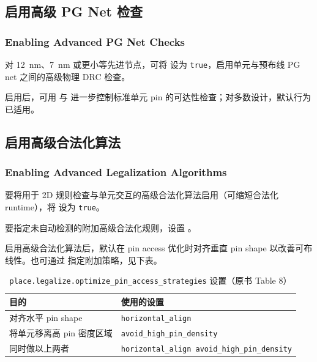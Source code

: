 \subsection{启用高级 PG Net 检查}
\subsubsection*{Enabling Advanced PG Net Checks}

对 12~nm、7~nm 或更小等先进节点，可将  设为 \texttt{true}，启用单元与预布线 PG net 之间的高级物理 DRC 检查。

启用后，可用  与  进一步控制标准单元 pin 的可达性检查；对多数设计，默认行为已适用。

\subsection{启用高级合法化算法}
\subsubsection*{Enabling Advanced Legalization Algorithms}

要将用于 2D 规则检查与单元交互的高级合法化算法启用（可缩短合法化 runtime），将  设为 \texttt{true}。

要指定未自动检测的附加高级合法化规则，设置 。

启用高级合法化算法后，默认在 pin access 优化时对齐垂直 pin shape 以改善可布线性。也可通过  指定附加策略，见下表。

\begin{table}[htbp]
\centering
\caption{\texttt{place.legalize.optimize\_pin\_access\_strategies} 设置（原书 Table 8）}
\label{tab:ch2b-pin-access-strategies}
\begin{tabularx}{\textwidth}{@{}X l@{}}
\toprule
\textbf{目的} & \textbf{使用的设置} \\
\midrule
对齐水平 pin shape & \texttt{horizontal\_align} \\
将单元移离高 pin 密度区域 & \texttt{avoid\_high\_pin\_density} \\
同时做以上两者 & \texttt{horizontal\_align avoid\_high\_pin\_density} \\
\bottomrule
\end{tabularx}
\end{table}

